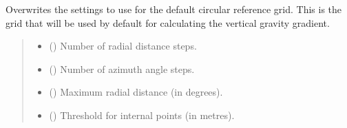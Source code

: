 \documentclass[letterpaper,10pt,english]{sphinxmanual}
\begin{document}
\begin{fulllineitems}
\label{\detokenize{modules/gravity/map:qnav.gravity.map.set_default_grid}}
\pysigstartsignatures
{}
\pysigstopsignatures
\sphinxAtStartPar
Overwrites the settings to use for the default circular reference grid.
This is the grid that will be used by default for calculating the
vertical gravity gradient.
\begin{quote}\begin{description}
\begin{itemize}
\item {} 
\sphinxAtStartPar
{} () \textendash{} Number of radial distance steps.

\item {} 
\sphinxAtStartPar
{} () \textendash{} Number of azimuth angle steps.

\item {} 
\sphinxAtStartPar
{} () \textendash{} Maximum radial distance (in degrees).

\item {} 
\sphinxAtStartPar
{} () \textendash{} Threshold for internal points (in metres).

\end{itemize}

\end{description}\end{quote}

\end{fulllineitems}

\end{document}
